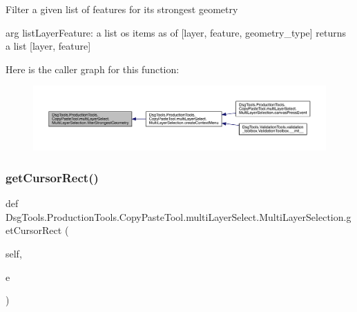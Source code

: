 \begin{DoxyVerb}Filter a given list of features for its strongest geometry

arg listLayerFeature: a list os items as of [layer, feature, geometry_type]
returns a list [layer, feature]
\end{DoxyVerb}
 Here is the caller graph for this function\+:
\nopagebreak
\begin{figure}[H]
\begin{center}
\leavevmode
\includegraphics[width=350pt]{class_dsg_tools_1_1_production_tools_1_1_copy_paste_tool_1_1multi_layer_select_1_1_multi_layer_selection_a15df3430dbf930ba31e2eadd1f8f2048_icgraph}
\end{center}
\end{figure}
\mbox{\label{class_dsg_tools_1_1_production_tools_1_1_copy_paste_tool_1_1multi_layer_select_1_1_multi_layer_selection_a5be869b251e0c3c15ddfd5b578d1d824}} 
\subsubsection{\texorpdfstring{get\+Cursor\+Rect()}{getCursorRect()}}
{\footnotesize\ttfamily def Dsg\+Tools.\+Production\+Tools.\+Copy\+Paste\+Tool.\+multi\+Layer\+Select.\+Multi\+Layer\+Selection.\+get\+Cursor\+Rect (\begin{DoxyParamCaption}\item[{}]{self,  }\item[{}]{e }\end{DoxyParamCaption})}

